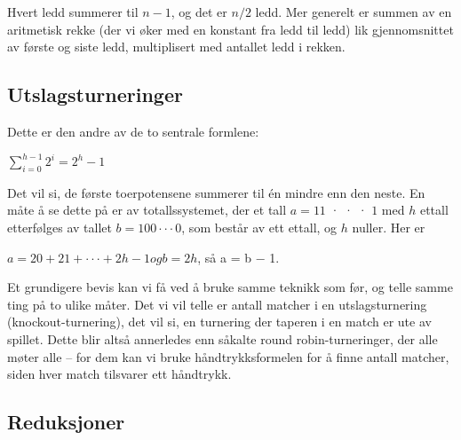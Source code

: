 \noindent Hvert ledd summerer til $n−1$, og det er $n/2$ ledd. Mer generelt er summen av en
aritmetisk rekke (der vi øker med en konstant fra ledd til ledd) lik gjennomsnittet
av første og siste ledd, multiplisert med antallet ledd i rekken.

\subsection{Utslagsturneringer}
Dette er den andre av de to sentrale formlene:
\begin{center}
$\sum\limits_{i=0}^{h-1} 2^i = 2^h - 1$
\end{center}
Det vil si, de første toerpotensene summerer til én mindre enn den neste. En
måte å se dette på er av totallssystemet, der et tall $a = 11$ · · · $1$ med $h$ ettall
etterfølges av tallet $b = 100 · · · 0$, som består av ett ettall, og $h$ nuller. Her er
\begin{center}
$a = 20 + 21 + · · · + 2h−1 og b = 2h$, så a = b − 1.
\end{center}

\noindent Et grundigere bevis kan vi få ved å bruke samme teknikk som før, og telle
samme ting på to ulike måter. Det vi vil telle er antall matcher i en utslagsturnering
(knockout-turnering), det vil si, en turnering der taperen i en match er
ute av spillet. Dette blir altså annerledes enn såkalte round robin-turneringer,
der alle møter alle – for dem kan vi bruke håndtrykksformelen for å finne antall
matcher, siden hver match tilsvarer ett håndtrykk.


\subsection{Reduksjoner}
